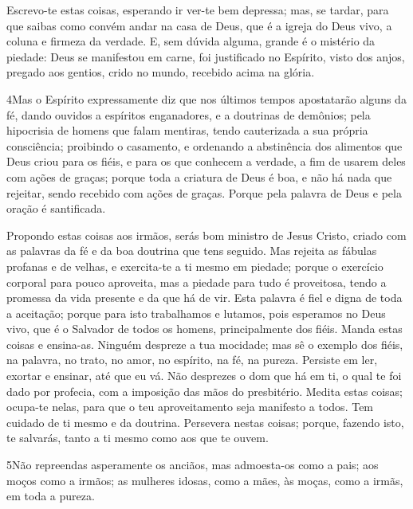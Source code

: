 Escrevo-te estas coisas, esperando ir ver-te bem depressa;
mas, se tardar, para que saibas como convém andar na casa de
Deus, que é a igreja do Deus vivo, a coluna e firmeza da verdade.
E, sem dúvida alguma, grande é o mistério da piedade: Deus se
manifestou em carne, foi justificado no Espírito, visto dos anjos,
pregado aos gentios, crido no mundo, recebido acima na glória.

\medskip

\lettrine{4} Mas o Espírito expressamente diz que nos últimos
tempos apostatarão alguns da fé, dando ouvidos a espíritos
enganadores, e a doutrinas de demônios; pela hipocrisia de
homens que falam mentiras, tendo cauterizada a sua própria
consciência; proibindo o casamento, e ordenando a abstinência
dos alimentos que Deus criou para os fiéis, e para os que conhecem a
verdade, a fim de usarem deles com ações de graças; porque toda
a criatura de Deus é boa, e não há nada que rejeitar, sendo recebido
com ações de graças. Porque pela palavra de Deus e pela oração é
santificada.

Propondo estas coisas aos irmãos, serás bom ministro de Jesus
Cristo, criado com as palavras da fé e da boa doutrina que tens
seguido. Mas rejeita as fábulas profanas e de velhas, e
exercita-te a ti mesmo em piedade; porque o exercício corporal
para pouco aproveita, mas a piedade para tudo é proveitosa, tendo a
promessa da vida presente e da que há de vir. Esta palavra é
fiel e digna de toda a aceitação; porque para isto
trabalhamos e lutamos, pois esperamos no Deus vivo, que é o Salvador
de todos os homens, principalmente dos fiéis. Manda estas
coisas e ensina-as. Ninguém despreze a tua mocidade; mas sê o
exemplo dos fiéis, na palavra, no trato, no amor, no espírito, na
fé, na pureza. Persiste em ler, exortar e ensinar, até que eu
vá. Não desprezes o dom que há em ti, o qual te foi dado por
profecia, com a imposição das mãos do presbitério. Medita
estas coisas; ocupa-te nelas, para que o teu aproveitamento seja
manifesto a todos. Tem cuidado de ti mesmo e da doutrina.
Persevera nestas coisas; porque, fazendo isto, te salvarás, tanto a
ti mesmo como aos que te ouvem.

\medskip

\lettrine{5} Não repreendas asperamente os anciãos, mas
admoesta-os como a pais; aos moços como a irmãos; as mulheres
idosas, como a mães, às moças, como a irmãs, em toda a pureza.

